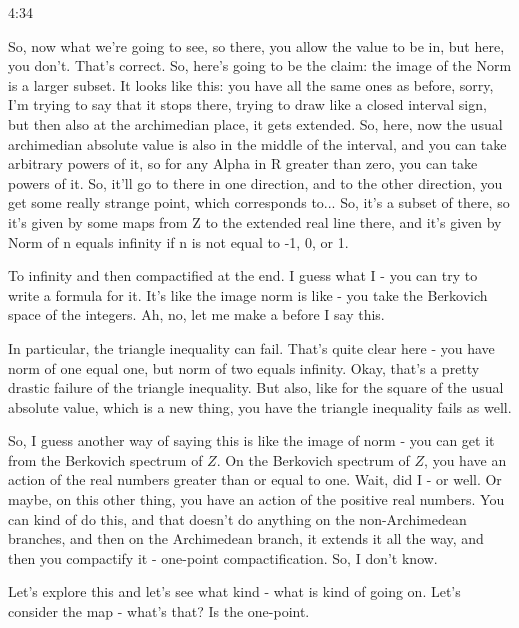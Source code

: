 \begin{unfinished}{4:34}
\begin{example}
\begin{example}
\begin{example}
So, now what we're going to see, so there, you allow the value to be in, but here, you don't. That's correct. So, here's going to be the claim: the image of the Norm is a larger subset. It looks like this: you have all the same ones as before, sorry, I'm trying to say that it stops there, trying to draw like a closed interval sign, but then also at the archimedian place, it gets extended. So, here, now the usual archimedian absolute value is also in the middle of the interval, and you can take arbitrary powers of it, so for any Alpha in R greater than zero, you can take powers of it. So, it'll go to there in one direction, and to the other direction, you get some really strange point, which corresponds to... So, it's a subset of there, so it's given by some maps from Z to the extended real line there, and it's given by Norm of n equals infinity if n is not equal to -1, 0, or 1.

To infinity and then compactified at the end. I guess what I - you can try to write a formula for it. It's like the image norm is like - you take the Berkovich space of the integers. Ah, no, let me make a before I say this.

In particular, the triangle inequality can fail. That's quite clear here - you have norm of one equal one, but norm of two equals infinity. Okay, that's a pretty drastic failure of the triangle inequality. But also, like for the square of the usual absolute value, which is a new thing, you have the triangle inequality fails as well.

So, I guess another way of saying this is like the image of norm - you can get it from the Berkovich spectrum of $Z$. On the Berkovich spectrum of $Z$, you have an action of the real numbers greater than or equal to one. Wait, did I - or well. Or maybe, on this other thing, you have an action of the positive real numbers. You can kind of do this, and that doesn't do anything on the non-Archimedean branches, and then on the Archimedean branch, it extends it all the way, and then you compactify it - one-point compactification. So, I don't know.

Let's explore this and let's see what kind - what is kind of going on. Let's consider the map - what's that? Is the one-point.


\end{example}
\end{example}
\end{example}
\end{unfinished}
